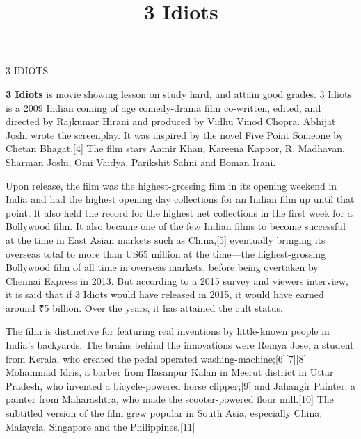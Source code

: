 \documentclass{article}
\title{3 Idiots}
\begin{document}
\begin{center} \LARGE 3 IDIOTS
\end{center}

\Large{
\begin{center}\textbf{3 Idiots} is movie showing lesson on study hard, and attain good grades. 3 Idiots is a 2009 Indian coming of age comedy-drama film co-written, edited, and directed by Rajkumar Hirani and produced by Vidhu Vinod Chopra. Abhijat Joshi wrote the screenplay. It was inspired by the novel Five Point Someone by Chetan Bhagat.[4] The film stars Aamir Khan, Kareena Kapoor, R. Madhavan, Sharman Joshi, Omi Vaidya, Parikshit Sahni and Boman Irani.

Upon release, the film was the highest-grossing film in its opening weekend in India and had the highest opening day collections for an Indian film up until that point. It also held the record for the highest net collections in the first week for a Bollywood film. It also became one of the few Indian films to become successful at the time in East Asian markets such as China,[5] eventually bringing its overseas total to more than US65 million at the time—the highest-grossing Bollywood film of all time in overseas markets, before being overtaken by Chennai Express in 2013. But according to a 2015 survey and viewers interview, it is said that if 3 Idiots would have released in 2015, it would have earned around ₹5 billion. Over the years, it has attained the cult status.

The film is distinctive for featuring real inventions by little-known people in India's backyards. The brains behind the innovations were Remya Jose, a student from Kerala, who created the pedal operated washing-machine;[6][7][8] Mohammad Idris, a barber from Hasanpur Kalan in Meerut district in Uttar Pradesh, who invented a bicycle-powered horse clipper;[9] and Jahangir Painter, a painter from Maharashtra, who made the scooter-powered flour mill.[10] The subtitled version of the film grew popular in South Asia, especially China, Malaysia, Singapore and the Philippines.[11] \end{center}}
\end{document}
